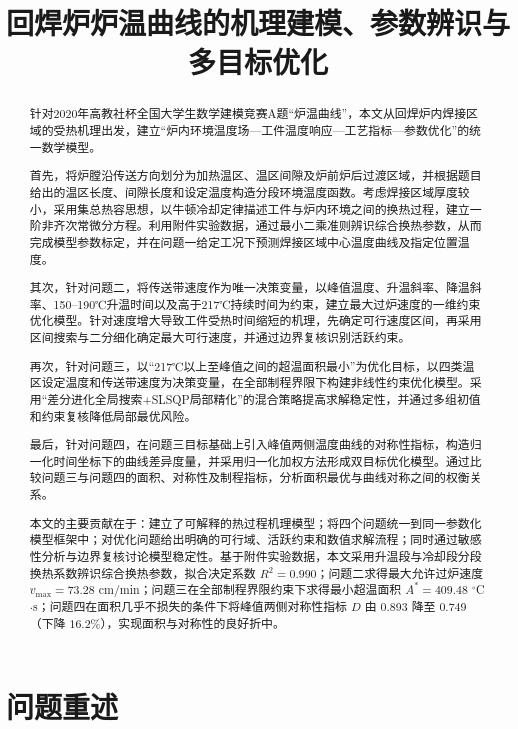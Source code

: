 \documentclass{cumcmthesis}
\title{回焊炉炉温曲线的机理建模、参数辨识与多目标优化}
\begin{document}
\maketitle

\begin{abstract}
针对2020年高教社杯全国大学生数学建模竞赛A题“炉温曲线”，本文从回焊炉内焊接区域的受热机理出发，建立“炉内环境温度场—工件温度响应—工艺指标—参数优化”的统一数学模型。

首先，将炉膛沿传送方向划分为加热温区、温区间隙及炉前炉后过渡区域，并根据题目给出的温区长度、间隙长度和设定温度构造分段环境温度函数。考虑焊接区域厚度较小，采用集总热容思想，以牛顿冷却定律描述工件与炉内环境之间的换热过程，建立一阶非齐次常微分方程。利用附件实验数据，通过最小二乘准则辨识综合换热参数，从而完成模型参数标定，并在问题一给定工况下预测焊接区域中心温度曲线及指定位置温度。

其次，针对问题二，将传送带速度作为唯一决策变量，以峰值温度、升温斜率、降温斜率、150--190℃升温时间以及高于217℃持续时间为约束，建立最大过炉速度的一维约束优化模型。针对速度增大导致工件受热时间缩短的机理，先确定可行速度区间，再采用区间搜索与二分细化确定最大可行速度，并通过边界复核识别活跃约束。

再次，针对问题三，以“217℃以上至峰值之间的超温面积最小”为优化目标，以四类温区设定温度和传送带速度为决策变量，在全部制程界限下构建非线性约束优化模型。采用“差分进化全局搜索+SLSQP局部精化”的混合策略提高求解稳定性，并通过多组初值和约束复核降低局部最优风险。

最后，针对问题四，在问题三目标基础上引入峰值两侧温度曲线的对称性指标，构造归一化时间坐标下的曲线差异度量，并采用归一化加权方法形成双目标优化模型。通过比较问题三与问题四的面积、对称性及制程指标，分析面积最优与曲线对称之间的权衡关系。

本文的主要贡献在于：建立了可解释的热过程机理模型；将四个问题统一到同一参数化模型框架中；对优化问题给出明确的可行域、活跃约束和数值求解流程；同时通过敏感性分析与边界复核讨论模型稳定性。基于附件实验数据，本文采用升温段与冷却段分段换热系数辨识综合换热参数，拟合决定系数 $R^2=0.990$；问题二求得最大允许过炉速度 $v_{\max}=73.28$ cm/min；问题三在全部制程界限约束下求得最小超温面积 $A^*=409.48$ $^\circ$C$\cdot$s；问题四在面积几乎不损失的条件下将峰值两侧对称性指标 $D$ 由 0.893 降至 0.749（下降 $16.2\%$），实现面积与对称性的良好折中。
\end{abstract}

\tableofcontents

\section{问题重述}
\end{document}
